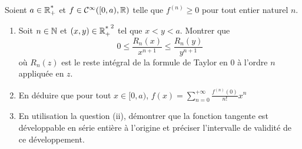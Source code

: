 \begin{exo}
	\label{seriesent4}
	Soient $a\in\operatorname{\mathbb R_+^*}$ et $f\in\mathcal C^\infty([0, a),\operatorname{\mathbb R})$ telle que $f^{(n)}\geq 0$ pour tout entier naturel $n$.
	\begin{enumerate}
		\item Soit $n\in\operatorname{\mathbb N}$ et $(x,y)\in{\operatorname{\mathbb R_+^*}}^2$ tel que $x < y < a$. Montrer que \[0\leq \frac{R_n(x)}{x^{n+1}}\leq \frac{R_n(y)}{y^{n+1}}\]
		où $R_n(z)$ est le reste intégral de la formule de Taylor en $0$ à l'ordre $n$ appliquée en $z$.
		\item En déduire que pour tout $x\in[0,a)$, $f(x)=\sum_{n=0}^{+\infty}\frac{f^{(n)}(0)}{n!}x^n$
		\item En utilisation la question (ii), démontrer que la fonction tangente est développable en série entière à l'origine et préciser l'intervalle de validité de ce développement.
	\end{enumerate}
\end{exo}


